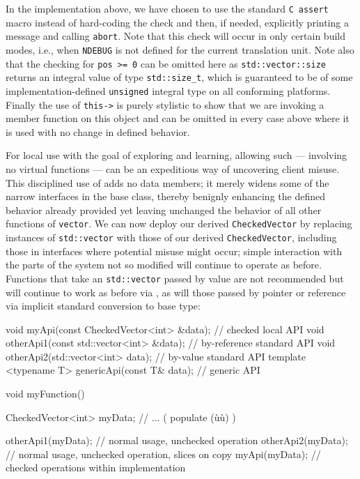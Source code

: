 {\noindent In the implementation above, we have chosen to use the standard
\lstinline!C!~\lstinline!assert! macro instead of hard-coding the check and
then, if needed, explicitly printing a message and calling
\lstinline!abort!. Note that this check will occur in only certain build
modes, i.e., when \lstinline!NDEBUG! is not defined for the current
translation unit. Note also that the checking for
\lstinline!pos!~\lstinline!>=!~\lstinline!0! can be omitted here as
\lstinline!std::vector::size! returns an integral value of type
\lstinline!std::size_t!, which is guaranteed to be of some
implementation-defined \lstinline!unsigned! integral type on all conforming
platforms. Finally the use of \lstinline!this->! is purely stylistic to
show that we are invoking a member function on this object and can be
omitted in every case above where it is used with no change in defined
behavior.

For local use with the goal of exploring and learning, allowing such
 --- involving no virtual functions ---
can be an expeditious way of uncovering client misuse. This disciplined
use of  adds no data members; it merely
widens some of the narrow interfaces in the base class, thereby benignly
enhancing the defined behavior already provided yet leaving unchanged
the behavior of all other functions of \lstinline!vector!. We can now
deploy our derived \lstinline!CheckedVector! by replacing instances of
\lstinline!std::vector! with those of our derived \lstinline!CheckedVector!,
including those in interfaces where potential misuse might occur; simple
interaction with the parts of the system not so modified will continue
to operate as before. Functions that take an \lstinline!std::vector! passed
by value are not recommended but will continue to work as before via
, as will those passed by pointer or reference via
implicit standard conversion to base type:

\begin{emcppslisting}
void myApi(const CheckedVector<int> &data);       // checked local API
void otherApi1(const std::vector<int> &data);     // by-reference standard API
void otherApi2(std::vector<int> data);            // by-value standard API
template <typename T> genericApi(const T& data);  // generic API

void myFunction()
{
    CheckedVector<int> myData;
    // ...                  ( populate (ù{}ù) )

    otherApi1(myData);   // normal usage, unchecked operation
    otherApi2(myData);   // normal usage, unchecked operation, slices on copy
    myApi(myData);       // checked operations within implementation

}
\end{emcppslisting}}
